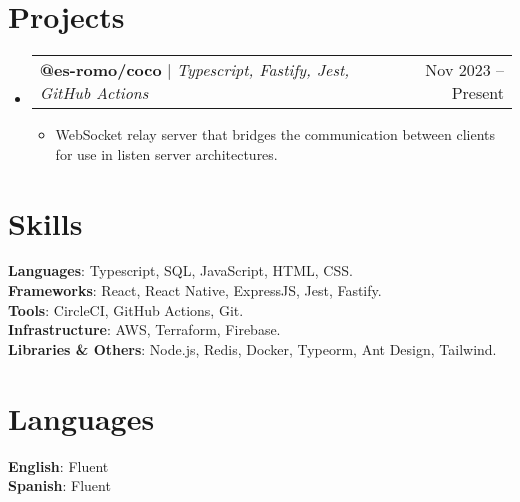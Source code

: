 \documentclass[letterpaper,11pt]{article}
\makeatletter
\newcommand{\resumeItem}[1]{
  \item\small{#1}
}
\newcommand{\resumeProjectHeading}[2]{
    \item
    \begin{tabular*}{0.97\textwidth}{l@{\extracolsep{\fill}}r}
      \small#1 & #2 \\
    \end{tabular*}\vspace{-7pt}
}
\newcommand{\resumeSubHeadingListStart}{\begin{itemize}[leftmargin=0.15in, label={}]}
\newcommand{\resumeSubHeadingListEnd}{\end{itemize}}
\newcommand{\resumeItemListStart}{\begin{itemize}}
\newcommand{\resumeItemListEnd}{\end{itemize}}
\makeatother
\begin{document}
\section{Projects}
    \resumeSubHeadingListStart
      \resumeProjectHeading
          {\textbf{@es-romo/coco} $|$ \emph{Typescript, Fastify, Jest, GitHub Actions }}{Nov 2023 -- Present}
          \resumeItemListStart
            \resumeItem{WebSocket relay server that bridges the communication between clients for use in listen server architectures.}
          \resumeItemListEnd
    \resumeSubHeadingListEnd

\begin{minipage}[t]{.78\textwidth}
  \section{Skills}
  \begin{itemize}[leftmargin=0.15in, label={}]
      \small{\item{
      \textbf{Languages}{: Typescript, SQL, JavaScript, HTML, CSS.} \\
      \textbf{Frameworks}{: React, React Native, ExpressJS, Jest, Fastify.} \\
      \textbf{Tools}{: CircleCI, GitHub Actions, Git.} \\
      \textbf{Infrastructure}{: AWS, Terraform, Firebase.} \\
      \textbf{Libraries \& Others}{: Node.js, Redis, Docker, Typeorm, Ant Design, Tailwind.} \\
      }}
  \end{itemize}
\end{minipage}\hspace{.02\textwidth}%
\begin{minipage}[t]{.20\textwidth}
  \section{Languages}
  \begin{itemize}[leftmargin=0.0in, label={}]
      \small{\item{
      \textbf{English}{: Fluent} \\
      \textbf{Spanish}{: Fluent} \\
      }}
  \end{itemize}
\end{minipage}\vspace{-10pt}
\end{document}
